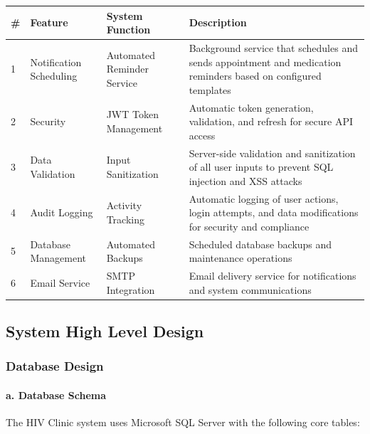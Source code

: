 \documentclass[12pt,a4paper]{article}
\begin{document}
\begin{longtable}{|p{1cm}|p{4cm}|p{4cm}|p{5cm}|}
\hline
\textbf{\#} & \textbf{Feature} & \textbf{System Function} & \textbf{Description} \\
\hline
1 & Notification Scheduling & Automated Reminder Service & Background service that schedules and sends appointment and medication reminders based on configured templates \\
\hline
2 & Security & JWT Token Management & Automatic token generation, validation, and refresh for secure API access \\
\hline
3 & Data Validation & Input Sanitization & Server-side validation and sanitization of all user inputs to prevent SQL injection and XSS attacks \\
\hline
4 & Audit Logging & Activity Tracking & Automatic logging of user actions, login attempts, and data modifications for security and compliance \\
\hline
5 & Database Management & Automated Backups & Scheduled database backups and maintenance operations \\
\hline
6 & Email Service & SMTP Integration & Email delivery service for notifications and system communications \\
\hline
\end{longtable}

\subsection{System High Level Design}

\subsubsection{Database Design}

\paragraph{a. Database Schema}

The HIV Clinic system uses Microsoft SQL Server with the following core tables:
\end{document}
